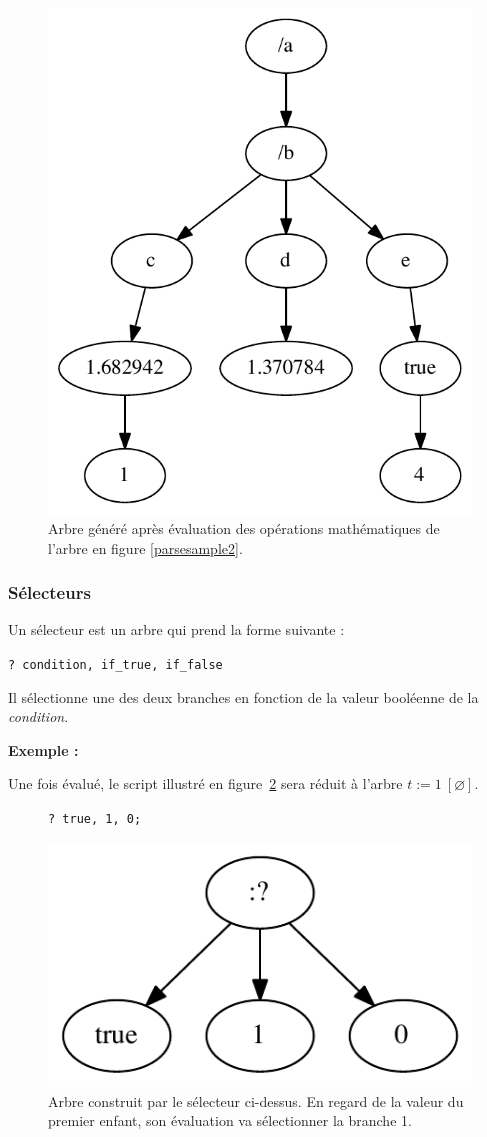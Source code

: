 \documentclass{article}
\newcommand{\exemple}	{\vspace*{1mm}\hspace*{-4mm}\textbf{Exemple :}}
\newcommand{\code}	[2][0.9]		{\vspace{0mm}\begin{center}\colorbox{mygrey}{
							\begin{minipage}[t]{#1\columnwidth} 
							{\small \texttt{#2}}
							\end{minipage}}\end{center}}
\newcommand{\nulltree}	{\ensuremath{\varnothing}}
\begin{document}
\begin{figure}[htbp]
\begin{center}
\includegraphics[width=0.5\columnwidth]{eval/sample3}
\caption{Arbre généré après évaluation des opérations mathématiques de l'arbre en figure \ref{parsesample2}.}
\label{treesample2}
\end{center}
\end{figure}


\subsubsection{Sélecteurs}

Un sélecteur est un arbre qui prend la forme suivante :
\code{? condition, if\_true, if\_false}
Il sélectionne une des deux branches en fonction de la valeur booléenne de la \emph{condition}.

\pagebreak
\exemple

Une fois évalué, le script illustré en figure~\ref{dotselect} sera réduit à l'arbre $t := 1\ [\nulltree]$.

\begin{figure}[htbp]
\code{? true, 1, 0;}
\begin{center}
\includegraphics[width=0.4\columnwidth]{tree/select}
\caption{Arbre construit par le sélecteur ci-dessus. En regard de la valeur du premier enfant, son évaluation va sélectionner la branche 1.}
\label{dotselect}
\end{center}
\end{figure}
\end{document}
